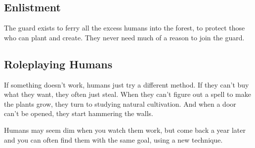 \begin{multicols}{2}
\subsection{Enlistment}

The \gls{guard} exists to ferry all the excess humans into the forest, to protect those who can plant and create.
They never need much of a reason to join the guard.

\subsection{Roleplaying Humans}

If something doesn't work, humans just try a different method.
If they can't buy what they want, they often just steal.
When they can't figure out a spell to make the plants grow, they turn to studying natural cultivation.
And when a door can't be opened, they start hammering the walls.

Humans may seem dim when you watch them work, but come back a year later and you can often find them with the same goal, using a new technique.

\end{multicols}

